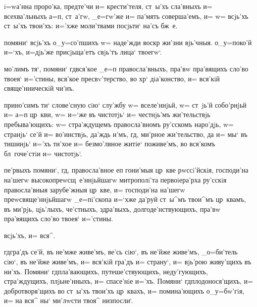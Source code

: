 
 i=wа'нна проро'ка, предте'чи и= крести'теля, 
ст~ы'хъ сла'вныхъ и= всехва'льныхъ а=п, ст~а'гw, 
 _е=гw'же и= па'мять соверша'емъ, и= w= всjь'хъ 
ст~ы'хъ твои'хъ: и='хже моли'твами посjьти` на'съ бж~е.

 помяни` всjь'хъ о_у=со'пшихъ w= наде'жди воскр 
жи'зни вjь'чныя.   о_у=поко'й и=`хъ, и=дjь'же 
присjьща'етъ свjь'тъ лица` твоегw`.

 мо'лимъ тя`, помяни` гд вся'кое _е=п 
правосла'вныхъ, пра'вw пра'вящихъ сло'во твоея` и='стины, 
вся'кое пресвv'терство, во хр` дiа'конство, и= 
вся'кiй свяще'нническiй чи'нъ.

 прино'симъ ти` слове'сную сiю` слу'жбу w= 
вселе'ннjьй, w= ст~jь'й собо'рнjьй и= а=п 
цр~кви, w= и=`же въ чистотjь` и= честнjь'мъ жи'тельствjь 
пребыва'ющихъ: w= стра'ждущемъ правосла'вномъ ру'сскомъ 
наро'дjь, w= странjь` се'й и= во'инствjь, да'ждь и'мъ, 
гд, ми'рное жи'тельство, да и= мы` въ тишинjь` и='хъ 
ти'хое и= безмо'лвное житiе` поживе'мъ, во вся'комъ 
бл~гоче'стiи и= чистотjь`.


 пе'рвыхъ помяни`, гд, правосла'вное еп 
гони'мыя цр~кве рwссi'йскiя, господи'на на'шегw 
высокопреwсщ~е'ннjьйшагw  митрополi'та   первоiера'рха ру'сскiя правосла'вныя зарубе'жныя 
цр~кве, и= господи'на на'шегw преwсвяще'ннjьйшагw \kinovar{[}{а=рхiепi'скопа} 
 _е=пi'скопа \kinovarsimple{и='мярекъ, _е=гw'же _о='бласть,]} и=`хже 
да'руй ст~ы^мъ твои^мъ цр~квамъ, въ ми'рjь, цjь'лыхъ, че'стныхъ, 
здра'выхъ, долгоде'нствующихъ, пра'вw пра'вящихъ сло'во 
твоея` и='стины.

 всjь'хъ, и= вся^.


 гд гра'дъ се'й, въ не'мже живе'мъ, 
\kinovarsimple{[и=ли`} ве'сь сiю`, въ не'йже живе'мъ,  _о=би'тель 
сiю`, въ не'йже живе'мъ,\kinovarsimple{]} и= вся'кiй гра'дъ и= страну`, 
и= вjь'рою живу'щихъ въ ни'хъ. 
Помяни` гд пла'вающихъ, путеше'ствующихъ, 
неду'гующихъ, стра'ждущихъ, плjьне'нныхъ, и= спасе'нiе 
и='хъ. Помяни` гд плодонося'щихъ, и= добротворя'щихъ 
во ст~ы'хъ твои'хъ цр~квахъ, и= помина'ющихъ о_у=бw'гiя, 
и= на вся^ ны` ми'лwсти твоя^ низпосли`.

